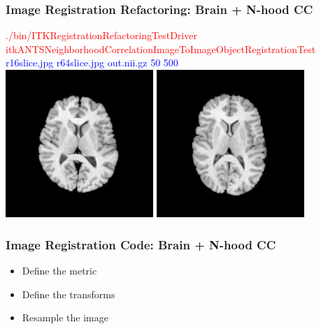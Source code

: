 \begin{frame}
\frametitle{Image Registration Refactoring: Brain + N-hood CC}
\textcolor{red}{./bin/ITKRegistrationRefactoringTestDriver itkANTSNeighborhoodCorrelationImageToImageObjectRegistrationTest}\\
\textcolor{blue}{r16slice.jpg r64slice.jpg out.nii.gz  50 500 }\\
\includegraphics[height=2.2in]{../Art/r16slice.jpg}
\includegraphics[height=2.2in]{../Art/r64slice.jpg}
\end{frame}

\begin{frame}
\frametitle{Image Registration Code: Brain + N-hood CC}
\begin{itemize}
\item Define the metric
\item Define the transforms
\item Resample the image
\end{itemize}

\end{frame}

